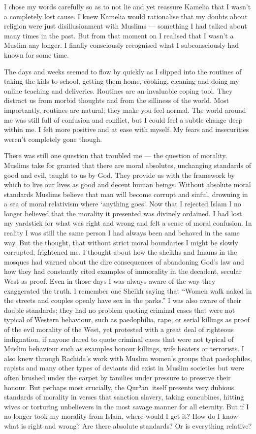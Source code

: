 \documentclass[12pt]{memoir}
\def\´{ʾ} %
\def \Quran{Qur\-\´ān} %
\begin{document}
I chose my words carefully so as to not lie and yet reassure Kamelia
that I wasn’t a completely lost cause.
I knew Kamelia would rationalise that my doubts about religion
were just disillusionment with Muslims —
something I had talked about many times in the past.
But from that moment on I realised that I wasn’t a Muslim any longer.
I finally consciously recognised what I subconsciously had known for some time.

The days and weeks seemed to flow by quickly as I slipped into the routines
of taking the kids to school, getting them home, cooking,
cleaning and doing my online teaching and deliveries.
Routines are an invaluable coping tool.
They distract us from morbid thoughts and from the silliness of the world.
Most importantly, routines are natural; they make you feel normal.
The world around me was still full of confusion and conflict,
but I could feel a subtle change deep within me.
I felt more positive and at ease with myself.
My fears and insecurities weren’t completely gone though.

There was still one question that troubled me — the question of morality.
Muslims take for granted that there are moral absolutes,
unchanging standards of good and evil, taught to us by God.
They provide us with the framework by which to live our lives
as good and decent human beings.
Without absolute moral standards Muslims believe
that man will become corrupt and sinful,
drowning in a sea of moral relativism where ‘anything goes’.
Now that I rejected Islam I no longer believed
that the morality it presented was divinely ordained.
I had lost my yardstick for what was right and wrong
and felt a sense of moral confusion.
In reality I was still the same person I had always been
and behaved in the same way.
But the thought, that without strict moral boundaries
I might be slowly corrupted, frightened me.
I thought about how the sheikhs and Imams in the mosques
had warned about the dire consequences of abandoning God’s law
and how they had constantly cited examples of immorality
in the decadent, secular West as proof.
Even in those days I was always aware of the way they exaggerated the truth.
I remember one Sheikh saying that
“Women walk naked in the streets and couples openly have sex in the parks.”
I was also aware of their double standards;
they had no problem quoting criminal cases that were not typical
of Western behaviour, such as paedophilia, rape, or serial killings
as proof of the evil morality of the West,
yet protested with a great deal of righteous indignation,
if anyone dared to quote criminal cases that were not typical
of Muslim behaviour such as examples honour killings,
wife beaters or terrorists.
I also knew through Rachida’s work with Muslim women’s groups
that paedophiles, rapists and many other types of deviants
did exist in Muslim societies but were often brushed under the carpet
by families under pressure to preserve their honour.
But perhaps most crucially, the \Quran\ itself presents
very dubious standards of morality in verses that sanction slavery,
taking concubines, hitting wives or torturing unbelievers
in the most savage manner for all eternity.
But if I no longer took my morality from Islam, where would I get it?
How do I know what is right and wrong?
Are there absolute standards?
Or is everything relative?
\end{document}
